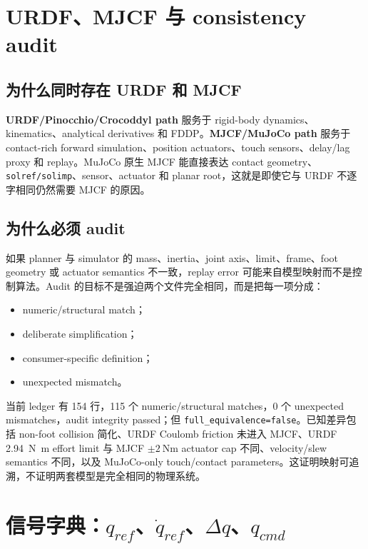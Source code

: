 \documentclass[UTF8,11pt,a4paper]{ctexart}
\newcommand{\code}[1]{\texttt{#1}}
\begin{document}
\section{URDF、MJCF 与 consistency audit}\label{sec:models}

\subsection{为什么同时存在 URDF 和 MJCF}

\textbf{URDF/Pinocchio/Crocoddyl path} 服务于 rigid-body dynamics、kinematics、analytical derivatives 和 FDDP。\textbf{MJCF/MuJoCo path} 服务于 contact-rich forward simulation、position actuators、touch sensors、delay/lag proxy 和 replay。MuJoCo 原生 MJCF 能直接表达 contact geometry、\code{solref/solimp}、sensor、actuator 和 planar root，这就是即使它与 URDF 不逐字相同仍然需要 MJCF 的原因\cite{todorov2012mujoco,carpentier2019pinocchio,mastalli2020crocoddyl}。

\subsection{为什么必须 audit}

如果 planner 与 simulator 的 mass、inertia、joint axis、limit、frame、foot geometry 或 actuator semantics 不一致，replay error 可能来自模型映射而不是控制算法。Audit 的目标不是强迫两个文件完全相同，而是把每一项分成：

\begin{itemize}
  \item numeric/structural match；
  \item deliberate simplification；
  \item consumer-specific definition；
  \item unexpected mismatch。
\end{itemize}

当前 ledger 有 154 行，115 个 numeric/structural matches，0 个 unexpected mismatches，audit integrity passed；但 \code{full\_equivalence=false}。已知差异包括 non-foot collision 简化、URDF Coulomb friction 未进入 MJCF、URDF \SI{2.94}{\newton\metre} effort limit 与 MJCF $\pm\SI{2}{\newton\metre}$ actuator cap 不同、velocity/slew semantics 不同，以及 MuJoCo-only touch/contact parameters。这证明映射可追溯，不证明两套模型是完全相同的物理系统。

\section{信号字典：\texorpdfstring{$q_{ref}$、$\dot q_{ref}$、$\Delta q$、$q_{cmd}$}{qref,dqref,deltaq,qcmd}}\label{sec:signals}
\end{document}
